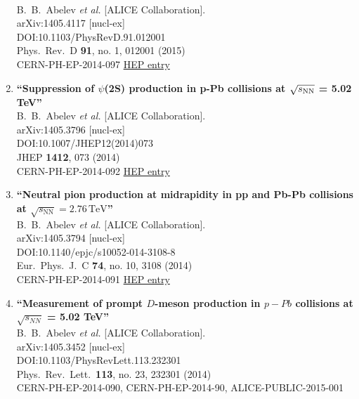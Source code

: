 \begin{enumerate}
  \\{}B.~B.~Abelev {\it et al.} [ALICE Collaboration].
  \\{}arXiv:1405.4117 [nucl-ex]
  \\{}DOI:10.1103/PhysRevD.91.012001
  \\{}Phys.\ Rev.\ D {\bf 91}, no. 1, 012001 (2015)
  \\{}CERN-PH-EP-2014-097
\href{http://inspirehep.net/record/1296860}{HEP entry}
\item%
{\bf ``Suppression of $\psi$(2S) production in p-Pb collisions at $\sqrt{s_{\rm NN}}$ = 5.02 TeV''}
  \\{}B.~B.~Abelev {\it et al.} [ALICE Collaboration].
  \\{}arXiv:1405.3796 [nucl-ex]
  \\{}DOI:10.1007/JHEP12(2014)073
  \\{}JHEP {\bf 1412}, 073 (2014)
  \\{}CERN-PH-EP-2014-092
\href{http://inspirehep.net/record/1296307}{HEP entry}
\item%
{\bf ``Neutral pion production at midrapidity in pp and Pb-Pb collisions at $\sqrt{s_{{\mathrm {NN}}}}= 2.76\,{\mathrm {TeV}}$''}
  \\{}B.~B.~Abelev {\it et al.} [ALICE Collaboration].
  \\{}arXiv:1405.3794 [nucl-ex]
  \\{}DOI:10.1140/epjc/s10052-014-3108-8
  \\{}Eur.\ Phys.\ J.\ C {\bf 74}, no. 10, 3108 (2014)
  \\{}CERN-PH-EP-2014-091
\href{http://inspirehep.net/record/1296306}{HEP entry}
\item%
{\bf ``Measurement of prompt $D$-meson production in $p-Pb$ collisions at $\sqrt{s_{NN}}$ = 5.02 TeV''}
  \\{}B.~B.~Abelev {\it et al.} [ALICE Collaboration].
  \\{}arXiv:1405.3452 [nucl-ex]
  \\{}DOI:10.1103/PhysRevLett.113.232301
  \\{}Phys.\ Rev.\ Lett.\  {\bf 113}, no. 23, 232301 (2014)
  \\{}CERN-PH-EP-2014-090, CERN-PH-EP-2014-90, ALICE-PUBLIC-2015-001

\end{enumerate}
